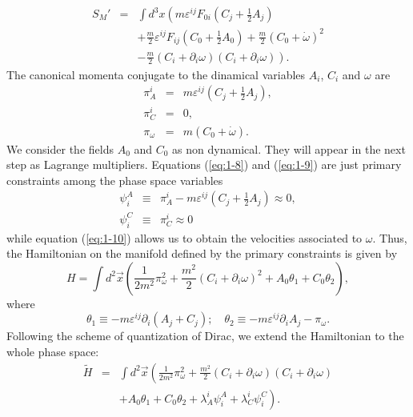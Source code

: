 \documentclass[a4paper,12pt]{article}
\newcommand{\eref}[1]{(\ref{#1})}
\begin{document}
\begin{eqnarray}
   S_M'&=&\int d^3x\left(m\varepsilon^{ij}F_{0i}\left(C_j+
\frac 12A_j\right)\nonumber\right.\\
&&+\frac m{2}\varepsilon^{ij}F_{ij}\left(C_0+\frac 12 A_0\right)+
\frac m{2}(C_0+\dot\omega)^2\nonumber\\
&&\left.-\frac m{2}(C_i+\partial_i\omega)
(C_i+\partial_i\omega)\right)\label{eq:1-7}.
\end{eqnarray}
The canonical momenta conjugate to the dinamical variables $A_i$, $C_i$
and $\omega$ are
\begin{eqnarray}
   \label{eq:1-8}
   \pi^i_A&=&m\varepsilon^{ij}\left(C_j+\frac 12 A_j\right),\\
   \pi^i_C&=&0,\label{eq:1-9}\\
   \pi_\omega&=&m(C_0+\dot\omega)\label{eq:1-10}.
\end{eqnarray}
We consider the fields $A_0$ and $C_0$ as non dynamical. They will appear in the
next step as Lagrange multipliers. Equations \eref{eq:1-8} and \eref{eq:1-9}
are just primary constraints among the phase space variables
\begin{eqnarray}
   \label{eq:1-11}
   \psi_i^A&\equiv& \pi^i_A-m\varepsilon^{ij}\left(C_j+\frac 12 A_j\right)\approx 0,\\
   \psi_i^C&\equiv&\pi^i_C\approx 0
\end{eqnarray}
while equation \eref{eq:1-10} allows us to obtain the velocities associated
to $\omega$. Thus, the Hamiltonian on the manifold defined by the primary
constraints is given by
\begin{equation}
   \label{eq:1-13}
   H=\int d^2\vec x\left(\frac1{2m^2}\pi_{\omega}^2+\frac{m^2}{2}(C_i+\partial_i\omega)^2
+A_0\theta_1+C_0\theta_2\right),
\end{equation}
where
\begin{equation}
   \label{eq:1-14}
   \theta_1\equiv-m\varepsilon^{ij}\partial_i(A_j+C_j);
\quad\theta_2\equiv-m\varepsilon^{ij}\partial_iA_j -\pi_\omega.
\end{equation}
Following the scheme of quantization of Dirac, we extend the
Hamiltonian to the whole phase space:
\begin{eqnarray}
     \tilde H&=&\int d^2\vec x\left(\frac1{2m^2}\pi_{\omega}^2+
\frac{m^2}{2}(C_i+\partial_i\omega)(C_i+\partial_i\omega)\right.\nonumber\\
&&\left.+A_0\theta_1+C_0\theta_2+\lambda_A^i\psi_i^A+\lambda_C^i\psi_i^C\right).\label{eq:1-15}
\end{eqnarray}
\end{document}
